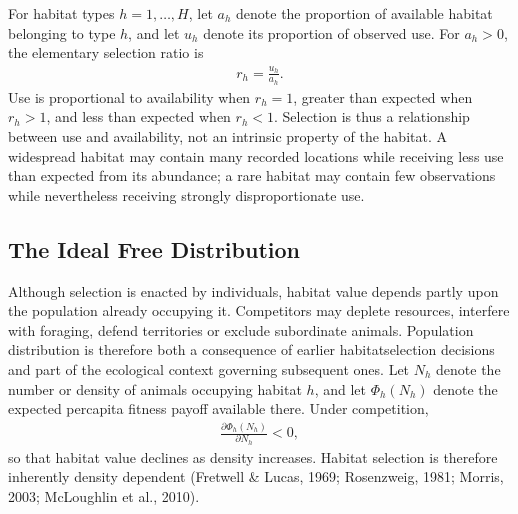 \documentclass[letterpaper,10pt,english]{sphinxmanual}
\begin{document}
\sphinxAtStartPar
For habitat types \(h=1,\ldots,H\), let \(a_h\) denote the proportion of available habitat belonging to type \(h\), and let \(u_h\) denote its proportion of observed use. For \(a_h>0\), the elementary selection ratio is
\begin{equation*}
\begin{split}
r_h = \frac{u_h}{a_h}.
\end{split}
\end{equation*}
\sphinxAtStartPar
Use is proportional to availability when \(r_h=1\), greater than expected when \(r_h>1\), and less than expected when \(r_h<1\). Selection is thus a relationship between use and availability, not an intrinsic property of the habitat. A widespread habitat may contain many recorded locations while receiving less use than expected from its abundance; a rare habitat may contain few observations while nevertheless receiving strongly disproportionate use.


\subsection{The Ideal Free Distribution}
\label{\detokenize{theory:the-ideal-free-distribution}}
\sphinxAtStartPar
Although selection is enacted by individuals, habitat value depends partly upon the population already occupying it. Competitors may deplete resources, interfere with foraging, defend territories or exclude subordinate animals. Population distribution is therefore both a consequence of earlier habitat\sphinxhyphen{}selection decisions and part of the ecological context governing subsequent ones. Let \(N_h\) denote the number or density of animals occupying habitat \(h\), and let \(\Phi_h(N_h)\) denote the expected per\sphinxhyphen{}capita fitness payoff available there. Under competition,
\begin{equation*}
\begin{split}
\frac{\partial \Phi_h(N_h)}{\partial N_h} < 0,
\end{split}
\end{equation*}
\sphinxAtStartPar
so that habitat value declines as density increases. Habitat selection is therefore inherently density dependent (Fretwell \& Lucas, 1969; Rosenzweig, 1981; Morris, 2003; McLoughlin et al., 2010).
\end{document}

